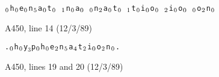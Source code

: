 {\def\\#1{$_{\kern\scriptspace#1}$}
\ninepoint\indent
{\qquad\tt\\0h\\0e\\0n\\5a\\0t\\0 \\1n\\0a\\0 \\0n\\2a\\0t\\0
  \\1t\\0i\\0o\\0 \\2i\\0o\\0 \\0o\\2n\\0}

\bugonpage A450, line 14 (12/3/89)

\ninepoint
{\tt.\\0h\\0y$_3$p\\0h\\0e\\2n\\5a\\4t\\2i\\0o\\2n\\0.}

\bugonpage A450, lines 19 and 20 (12/3/89)

}
